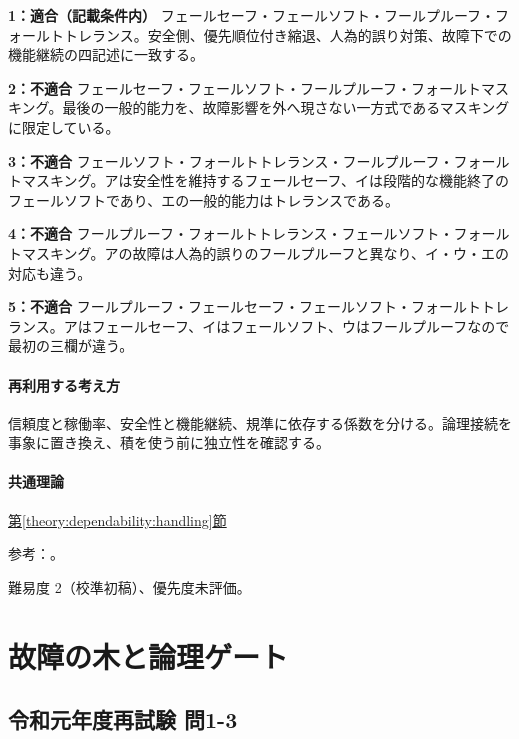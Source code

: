 \noindent\textbf{1：適合（記載条件内）} フェールセーフ・フェールソフト・フールプルーフ・フォールトトレランス。安全側、優先順位付き縮退、人為的誤り対策、故障下での機能継続の四記述に一致する。\par

\noindent\textbf{2：不適合} フェールセーフ・フェールソフト・フールプルーフ・フォールトマスキング。最後の一般的能力を、故障影響を外へ現さない一方式であるマスキングに限定している。\par

\noindent\textbf{3：不適合} フェールソフト・フォールトトレランス・フールプルーフ・フォールトマスキング。アは安全性を維持するフェールセーフ、イは段階的な機能終了のフェールソフトであり、エの一般的能力はトレランスである。\par

\noindent\textbf{4：不適合} フールプルーフ・フォールトトレランス・フェールソフト・フォールトマスキング。アの故障は人為的誤りのフールプルーフと異なり、イ・ウ・エの対応も違う。\par

\noindent\textbf{5：不適合} フールプルーフ・フェールセーフ・フェールソフト・フォールトトレランス。アはフェールセーフ、イはフェールソフト、ウはフールプルーフなので最初の三欄が違う。\par

\paragraph{再利用する考え方} 信頼度と稼働率、安全性と機能継続、規準に依存する係数を分ける。論理接続を事象に置き換え、積を使う前に独立性を確認する。

\paragraph{共通理論} \hyperref[theory:dependability:handling]{第\ref*{theory:dependability:handling}節}

\par 参考：\cite{design_mhlw_foolproof,design_mhlw_failsafe,design_nasa_tolerance}。

\par 難易度 2（校準初稿）、優先度未評価。

\section{故障の木と論理ゲート}

\subsection{令和元年度再試験 問1-3}
\label{q:r01-ret-basic-1-3}

